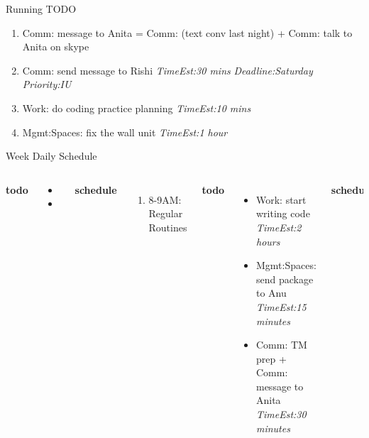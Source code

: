 \documentclass[serif, mathserif, final]{beamer}
\newcommand{\te}[1]{\textit{TimeEst:}\textit{#1}}
\newcommand{\dl}[1]{\textit{Deadline:}\textit{#1}}
\newcommand{\pr}[1]{\textit{Priority:}\textit{#1}}
\begin{document}
\begin{frame}
\begin{columns}
\begin{column}{0.50\linewidth}
\begin{block}{Running TODO}
\begin{enumerate}
        \item \small Comm: message to Anita = Comm: (text conv last
          night) +  Comm: talk to Anita on skype 
        \item \small Comm: send message to Rishi \te{30 mins}
          \dl{Saturday} \pr{IU} 

        \item \small Work: do coding practice planning \te{10 mins} 

       \item \small Mgmt:Spaces: fix the wall unit \te{1 hour} 
        \end{enumerate}
      \end{block} 
      \begin{block}{Week Daily Schedule} 
        \begin{columns} 
          \textbf{\small todo} \\ 
          \begin{itemize}
            \tiny \item \tiny 
          \item \tiny 
          \end{itemize} 
          \textbf{\small schedule} \\
          \begin{enumerate} 
            \tiny \item \tiny 8-9AM: Regular Routines 
          \end{enumerate} 
          
          \textbf{\small todo} \\
          \begin{itemize}
            \tiny \item \tiny Work: start writing code \te{2 hours} 
          \item \tiny Mgmt:Spaces: send package to Anu \te{15 minutes} 
          \item \tiny Comm: TM prep + Comm: message to Anita  \te{30
            minutes} 
          \end{itemize}  
          \textbf{\small schedule} 
          \begin{enumerate}
            \tiny \item \tiny 10AM - 11AM = update org 
          \item \tiny 11AM - 12AM = make long-term goals 
          \item \tiny 12PM - 2PM = start writing code and make the
            framework. 
            \tiny \item \tiny 2PM -3PM = meet for apartment showing
            and respond about apartment. 
          \item \tiny 6PM - 10PM = worklife + write code 
          \end{enumerate}  


\end{columns}
\end{block}
\end{column}
\end{columns}
\end{frame}
\end{document}

